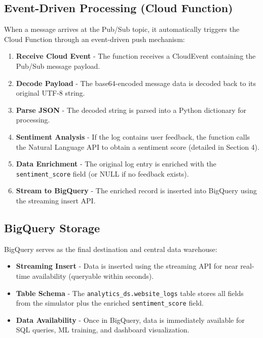 \documentclass[12pt,a4paper]{article}
\begin{document}
\subsection{Event-Driven Processing (Cloud Function)}

When a message arrives at the Pub/Sub topic, it automatically triggers the Cloud Function through an event-driven push mechanism:

\begin{enumerate}
    \item \textbf{Receive Cloud Event} - The function receives a CloudEvent containing the Pub/Sub message payload.
    \item \textbf{Decode Payload} - The base64-encoded message data is decoded back to its original UTF-8 string.
    \item \textbf{Parse JSON} - The decoded string is parsed into a Python dictionary for processing.
    \item \textbf{Sentiment Analysis} - If the log contains user feedback, the function calls the Natural Language API to obtain a sentiment score (detailed in Section 4).
    \item \textbf{Data Enrichment} - The original log entry is enriched with the \texttt{sentiment\_score} field (or NULL if no feedback exists).
    \item \textbf{Stream to BigQuery} - The enriched record is inserted into BigQuery using the streaming insert API.
\end{enumerate}

\subsection{BigQuery Storage}

BigQuery serves as the final destination and central data warehouse:

\begin{itemize}
    \item \textbf{Streaming Insert} - Data is inserted using the streaming API for near real-time availability (queryable within seconds).
    \item \textbf{Table Schema} - The \texttt{analytics\_ds.website\_logs} table stores all fields from the simulator plus the enriched \texttt{sentiment\_score} field.
    \item \textbf{Data Availability} - Once in BigQuery, data is immediately available for SQL queries, ML training, and dashboard visualization.
\end{itemize}
\end{document}
